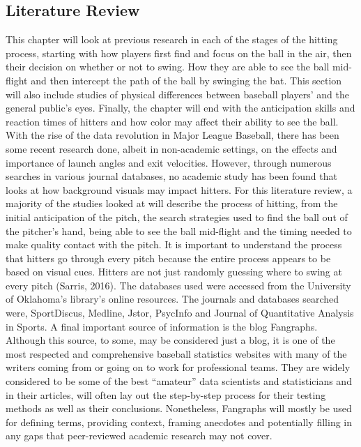 \documentclass{article}
\begin{document}
\begin{doublespace}
\section{Literature Review}
This chapter will look at previous research in each of the stages of the hitting process, starting with how players first find and focus on the ball in the air, then their decision on whether or not to swing. How they are able to see the ball mid-flight and then intercept the path of the ball by swinging the bat. This section will also include studies of physical differences between baseball players’ and the general public’s eyes. Finally, the chapter will end with the anticipation skills and reaction times of hitters and how color may affect their ability to see the ball.  
With the rise of the data revolution in Major League Baseball, there has been some recent research done, albeit in non-academic settings, on the effects and importance of launch angles and exit velocities. However, through numerous searches in various journal databases, no academic study has been found that looks at how background visuals may impact hitters. For this literature review, a majority of the studies looked at will describe the process of hitting, from the initial anticipation of the pitch, the search strategies used to find the ball out of the pitcher’s hand, being able to see the ball mid-flight and the timing needed to make quality contact with the pitch. It is important to understand the process that hitters go through every pitch because the entire process appears to be based on visual cues. Hitters are not just randomly guessing where to swing at every pitch (Sarris, 2016). The databases used were accessed from the University of Oklahoma’s library’s online resources. The journals and databases searched were, SportDiscus, Medline, Jstor, PsycInfo and Journal of Quantitative Analysis in Sports. A final important source of information is the blog Fangraphs. Although this source, to some, may be considered just a blog, it is one of the most respected and comprehensive baseball statistics websites with many of the writers coming from or going on to work for professional teams. They are widely considered to be some of the best “amateur” data scientists and statisticians and in their articles, will often lay out the step-by-step process for their testing methods as well as their conclusions. Nonetheless, Fangraphs will mostly be used for defining terms, providing context, framing anecdotes and potentially filling in any gaps that peer-reviewed academic research may not cover. 


\end{doublespace}
\end{document}
